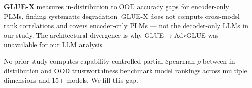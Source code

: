 \textbf{GLUE-X} \citep{Yang2023GLUEX} measures in-distribution to OOD accuracy gaps for encoder-only PLMs, finding systematic degradation. GLUE-X does not compute cross-model rank correlations and covers encoder-only PLMs --- not the decoder-only LLMs in our study. The architectural divergence is why GLUE$\rightarrow$AdvGLUE was unavailable for our LLM analysis.

No prior study computes capability-controlled partial Spearman $\rho$ between in-distribution and OOD trustworthiness benchmark model rankings across multiple dimensions and 15+ models. We fill this gap.
